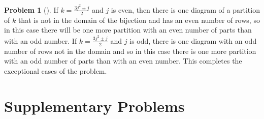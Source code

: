\documentclass[10pt,]{book}
\theoremstyle{plain}
\theoremstyle{definition}
\newtheorem{activity}[project]{Problem}
\theoremstyle{definition}
\numberwithin{equation}{chapter}
\begin{document}
\begin{activity}[]
\par
If \(k= \frac{3j^2\pm j}{2}\) and \(j\) is even, then there is one diagram of a partition of \(k\) that is not in the domain of the bijection and has an even number of rows, so in this case there will be one more partition with an even number of parts than with an odd number. If \(k= \frac{3j^2\pm j}{2}\) and \(j\) is odd, there is one diagram with an odd number of rows not in the domain and so in this case there is one more partition with an odd number of parts than with an even number. This completes the exceptional cases of the problem.%
\end{activity}
\typeout{************************************************}
\typeout{************************************************}
\section[{Supplementary Problems}]{Supplementary Problems}\label{sec_distribution-suppprobs}
\end{document}
